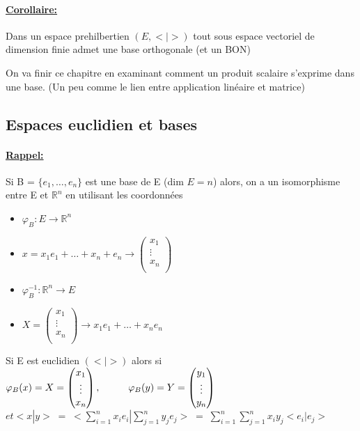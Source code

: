 \documentclass{article}
\newcommand\tab[1][1cm]{\hspace*{#1}}
\begin{document}
\paragraph{\underline{Corollaire:}} Dans un espace prehilbertien $(E, <|>)$ tout sous espace vectoriel de dimension finie admet une base orthogonale (et un BON)

On va finir ce chapitre en examinant comment un produit scalaire s'exprime dans une base. (Un peu comme le lien entre application linéaire et matrice)

\newpage

\subsection{Espaces euclidien et bases}

\paragraph{\underline{Rappel:}} Si B = $\{e_1, \dots, e_n\}$ est une base de E (dim $E = n$) alors, on a un isomorphisme entre E et $\mathbb{R}^n$ en utilisant les coordonnées
\begin{itemize}
    \item[] $\varphi_B : E \rightarrow \mathbb{R}^n$
    \item[] $x = x_1 e_1 + \dots + x_n + e_n \rightarrow
    \begin{pmatrix}
        x_1 \\
        \vdots \\
        x_n \\
    \end{pmatrix}$
    \item[] $\varphi_B^{-1} : \mathbb{R}^n \rightarrow E$
    \item[] $X = 
    \begin{pmatrix}
        x_1 \\
        \vdots \\
        x_n \\
    \end{pmatrix} \rightarrow x_1 e_1 + \dots + x_n e_n$
\end{itemize}

Si E est euclidien $(<|>)$ alors si $\varphi_B(x) = X =
\begin{pmatrix}
    x_1 \\
    \vdots \\
    x_n \\
\end{pmatrix}, \tab \varphi_B(y) = Y = 
\begin{pmatrix}
    y_1 \\
    \vdots \\
    y_n \\
\end{pmatrix}$ \\
$et <x | y> \;=\; <\sum_{i = 1}^n x_i e_i | \sum_{j = 1}^n y_j e_j > \;=\; \sum_{i = 1}^n\sum_{j = 1}^n x_i y_j <e_i | e_j>$
\end{document}
